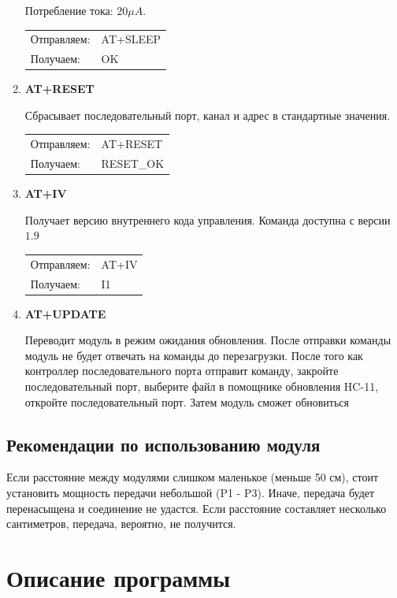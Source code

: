 \documentclass[bibliography=totocnumbered]{scrartcl}
\begin{document}
\begin{enumerate}
Потребление тока: $20 \mu A$.

\begin{tabular}{ l l }
  Отправляем: & AT+SLEEP \\
  Получаем: & OK\\
\end{tabular}



\item \textbf{AT+RESET}

Сбрасывает последовательный порт, канал и адрес в стандартные значения.

\begin{tabular}{ l l }
  Отправляем: & AT+RESET \\
  Получаем: & RESET\_OK\\
\end{tabular}


\item \textbf{AT+IV}

Получает версию внутреннего кода управления. Команда доступна с версии $1.9$

\begin{tabular}{ l l }
  Отправляем: & AT+IV \\
  Получаем: & I1\\
\end{tabular}


\item \textbf{AT+UPDATE}

Переводит модуль в режим ожидания обновления.
После отправки команды модуль не будет отвечать на команды до перезагрузки.
После того как контроллер последовательного порта отправит команду, закройте последовательный порт, выберите файл в помощнике обновления HC-11, откройте последовательный порт. Затем модуль сможет обновиться

\end{enumerate}

\subsection{Рекомендации по использованию модуля}

Если расстояние между модулями слишком маленькое (меньше 50 см), стоит установить мощность передачи небольшой (P1 - P3). Иначе, передача будет перенасыщена и соединение не удастся. Если расстояние составляет несколько сантиметров, передача, вероятно, не получится.

\section{Описание программы}
\end{document}
